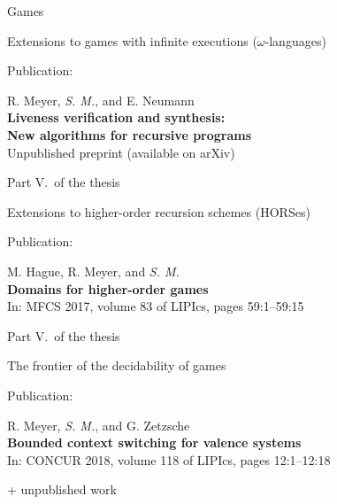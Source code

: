 \documentclass[../talk.tex]{subfiles}
\begin{document}
\begin{frame}{Games}
\begin{overlayarea}{\slidewidth}{\slideheight}
{            \vspace*{2.3em}

            Extensions to games with infinite executions ($\omega$-languages)

            \vspace*{2.3em}

            \alert{Publication:}

            \vspace*{1em}

            R. Meyer, \textit{S. M.}, and E. Neumann
            \\
            \textbf{Liveness verification and synthesis:\\ New algorithms for recursive programs}
            \\
            Unpublished preprint (available on arXiv)

        }
        {%
            Part V.~of the thesis

            \vspace*{2.3em}

            Extensions to higher-order recursion schemes (HORSes)

            \vspace*{2.3em}

            \alert{Publication:}

            \vspace*{1em}

            M. Hague, R. Meyer, and \textit{S. M.}
            \\
            \textbf{Domains for higher-order games}
            \\
            In: MFCS 2017, volume 83 of LIPIcs, pages 59:1--59:15
        }
        {%
            Part V.~of the thesis

            \vspace*{2.3em}

            The frontier of the decidability of games

            \vspace*{2.3em}

            \alert{Publication:}

            \vspace*{1em}


            R. Meyer, \textit{S. M.}, and G. Zetzsche
            \\
            \textbf{Bounded context switching for valence systems}
            \\
            In: CONCUR 2018, volume 118 of LIPIcs, pages 12:1--12:18

            \vspace*{1.5em}

            + unpublished work
        }
    \end{overlayarea}
\end{frame}
\end{document}
